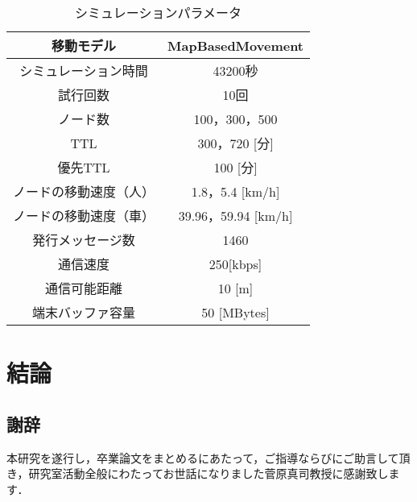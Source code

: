 \documentclass[11pt]{icsthesis}
\begin{document}
\begin{table}[h]
    \begin{center}
      \caption[]{シミュレーションパラメータ}
      \label{example:terminology}
      \begin{tabular}{|c|c|}
        \hline
        移動モデル & MapBasedMovement\\
        \hline
        シミュレーション時間 & 43200秒\\
        \hline
        試行回数 & 10回\\
        \hline
        ノード数 & 100，300，500\\
        \hline
        TTL & 300，720 [分]\\
        \hline
        優先TTL & 100 [分]\\
        \hline
        ノードの移動速度（人） & 1.8，5.4 [km/h]\\
        \hline
        ノードの移動速度（車） & 39.96，59.94 [km/h]\\
        \hline
        発行メッセージ数 & 1460\\
        \hline
        通信速度 & 250[kbps]\\
        \hline
        通信可能距離 & 10 [m]\\
        \hline
        端末バッファ容量 & 50 [MBytes]\\
        \hline
      \end{tabular}
    \end{center}
\end{table}

\chapter{結論}




\clearpage
\fancyhead[L]{}\fancyhead[R]{}
\renewcommand{\headrulewidth}{0truemm}
\section*{謝辞}
本研究を遂行し，卒業論文をまとめるにあたって，ご指導ならびにご助言して頂き，研究室活動全般にわたってお世話になりました菅原真司教授に感謝致します．
\end{document}
